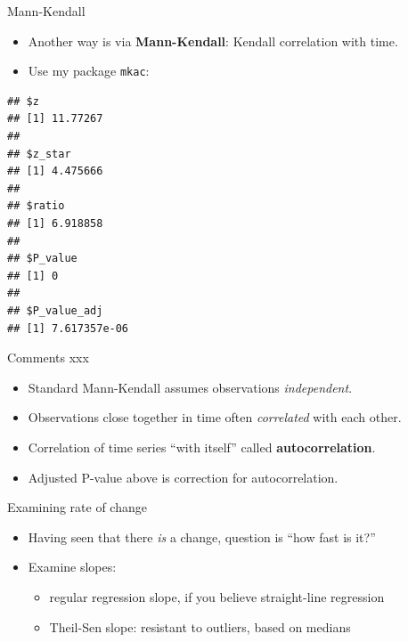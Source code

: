 \documentclass[ignorenonframetext,]{beamer}
\newenvironment{Shaded}{\begin{snugshade}}{\end{snugshade}}
\newcommand{\KeywordTok}[1]{\textcolor[rgb]{0.13,0.29,0.53}{\textbf{#1}}}
\newcommand{\NormalTok}[1]{#1}
\newcommand{\OperatorTok}[1]{\textcolor[rgb]{0.81,0.36,0.00}{\textbf{#1}}}
\providecommand{\tightlist}{%
  \setlength{\itemsep}{0pt}\setlength{\parskip}{0pt}}
\begin{document}
\begin{frame}[fragile]{Mann-Kendall}
\protect\hypertarget{mann-kendall}{}

\begin{itemize}
\item
  Another way is via \textbf{Mann-Kendall}: Kendall correlation with
  time.
\item
  Use my package \texttt{mkac}:
\end{itemize}

\footnotesize

\begin{Shaded}
\end{Shaded}

\begin{verbatim}
## $z
## [1] 11.77267
## 
## $z_star
## [1] 4.475666
## 
## $ratio
## [1] 6.918858
## 
## $P_value
## [1] 0
## 
## $P_value_adj
## [1] 7.617357e-06
\end{verbatim}

\normalsize

\end{frame}

\begin{frame}{Comments xxx}
\protect\hypertarget{comments-xxx}{}

\begin{itemize}
\tightlist
\item
  Standard Mann-Kendall assumes observations \emph{independent}.
\item
  Observations close together in time often \emph{correlated} with each
  other.
\item
  Correlation of time series ``with itself'' called
  \textbf{autocorrelation}.
\item
  Adjusted P-value above is correction for autocorrelation.
\end{itemize}

\end{frame}

\begin{frame}{Examining rate of change}
\protect\hypertarget{examining-rate-of-change}{}

\begin{itemize}
\item
  Having seen that there \emph{is} a change, question is ``how fast is
  it?''
\item
  Examine slopes:

  \begin{itemize}
  \tightlist
  \item
    regular regression slope, if you believe straight-line regression
  \item
    Theil-Sen slope: resistant to outliers, based on medians
  \end{itemize}
\end{itemize}

\end{frame}
\end{document}

